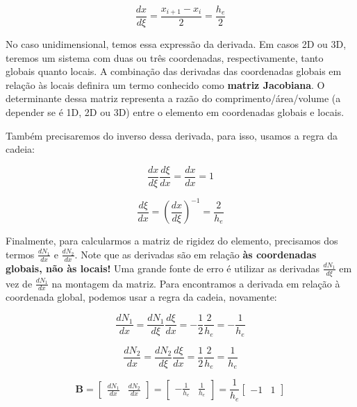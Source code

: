        \begin{equation}
            \frac{dx}{d\xi} = \frac{x_{i+1}-x_i}{2} = \frac{h_e}{2}
       \end{equation}

       No caso unidimensional, temos essa expressão da derivada. Em casos 2D ou 3D, teremos um sistema com duas ou três coordenadas, respectivamente, tanto globais quanto locais. A combinação das derivadas das coordenadas globais em relação às locais definira um termo conhecido como \textbf{matriz Jacobiana}. O determinante dessa matriz representa a razão do comprimento/área/volume (a depender se é 1D, 2D ou 3D) entre o elemento em coordenadas globais e locais.

       Também precisaremos do inverso dessa derivada, para isso, usamos a regra da cadeia:

       \begin{equation*}
            \frac{dx}{d\xi} \frac{d\xi}{dx} = \frac{dx}{dx} = 1 
       \end{equation*}

       \begin{equation*}
            \frac{d\xi}{dx} = \left(\frac{dx}{d\xi}\right)^{-1} = \frac{2}{h_e}
       \end{equation*}

       Finalmente, para calcularmos a matriz de rigidez do elemento, precisamos dos termos $\frac{dN_1}{dx}$ e $\frac{dN_2}{dx}$. Note que as derivadas são em relação \textbf{às coordenadas globais, não às locais!} Uma grande fonte de erro é utilizar as derivadas $\frac{dN_1}{d\xi}$ em vez de $\frac{dN_1}{dx}$ na montagem da matriz. Para encontramos a derivada em relação à coordenada global, podemos usar a regra da cadeia, novamente:

       \begin{equation*}
            \frac{dN_1}{dx} = \frac{dN_1}{d\xi} \frac{d\xi}{dx} = -\frac{1}{2} \frac{2}{h_e} = -\frac{1}{h_e}
       \end{equation*}

       \begin{equation*}
            \frac{dN_2}{dx} = \frac{dN_2}{d\xi} \frac{d\xi}{dx} = \frac{1}{2} \frac{2}{h_e} = \frac{1}{h_e}
       \end{equation*}


       \begin{equation*}
            \mathbf{B} = 
            \begin{bmatrix}
            \frac{dN_1}{dx} &
            \frac{dN_2}{dx}
            \end{bmatrix} = 
            \begin{bmatrix}
            -\frac{1}{h_e} &
            \frac{1}{h_e}
            \end{bmatrix}=
            \frac{1}{h_e}
            \begin{bmatrix}
            -1 &
            1
            \end{bmatrix}
       \end{equation*}

